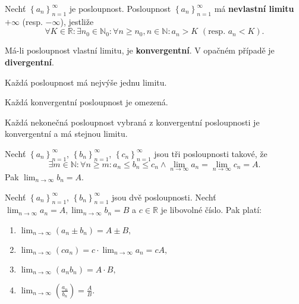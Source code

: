 \begin{definition}
Nechť $\left \{ a_n \right \}_{n=1}^\infty $ je posloupnost.
Posloupnost $\left \{ a_n \right \}_{n=1}^\infty $ má \textbf{nevlastní limitu}
$+\infty$ (resp. $-\infty$), jestliže
$$\forall K \in \mathbb R: \exists n_0 \in \mathbb N_0: \forall n \geq n_0, n\in \mathbb N: a_n>K \,\, (\textrm{resp. } a_n<K).$$
\end{definition}

\begin{definition}
    Má-li posloupnost vlastní limitu, je \textbf{konvergentní}. V opačném
    případě je \textbf{divergentní}.
\end{definition}

\begin{veta}
    Každá posloupnost má nejvýše jednu limitu.
\end{veta}

\begin{veta}
    Každá konvergentní posloupnost je omezená.
\end{veta}

\begin{veta}
    Každá nekonečná posloupnost vybraná z konvergentní posloupnosti
    je konvergentní a má stejnou limitu.
\end{veta}

\begin{veta}
    Nechť $\left \{ a_n \right \}_{n=1}^\infty $, $\left \{ b_n \right \}_{n=1}^\infty $,
    $\left \{ c_n \right \}_{n=1}^\infty $ jsou tři posloupnosti takové, že
    $$\exists m\in \mathbb N: \forall n \geq m:a_n \leq b_n \leq c_n \land \lim_{n\to \infty}a_n=\lim_{n\to \infty}c_n=A.$$
    Pak $\lim_{n\to\infty}b_n=A.$
\end{veta}

\begin{veta}
Nechť $\left \{ a_n \right \}_{n=1}^\infty $, $\left \{ b_n \right \}_{n=1}^\infty $
jsou dvě posloupnosti. Nechť $\lim_{n\to \infty}a_n = A, \lim_{n\to \infty}b_n = B$
a $c\in \mathbb R$ je libovolné číslo. Pak platí:
\begin{enumerate}[$i.$]
\item $\lim_{n\to \infty}\left ( a_n\pm b_n \right ) =A\pm B,$
\item $\lim_{n\to\infty}\left ( ca_n \right ) =c\cdot \lim_{n\to\infty}a_n=cA,$
\item $\lim_{n\to\infty}\left ( a_nb_n \right )=A\cdot B, $
\item $\lim_{n\to\infty}\left ( \frac{a_n}{b_n} \right ) =\frac{A}{B}.$
\end{enumerate}
\end{veta}

